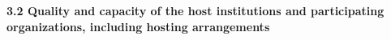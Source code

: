 \documentclass[11pt,a4paper]{article}
\begin{document}




\noindent\textbf{3.2 Quality and capacity of the host institutions and participating organizations, including hosting arrangements}
\end{document}
